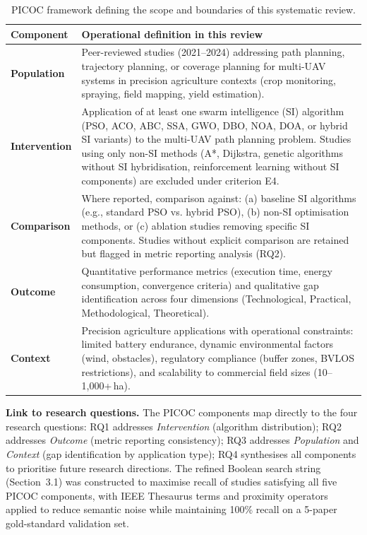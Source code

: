 \documentclass[review,3p,times]{elsarticle}
\begin{document}
\begin{table}[htbp]
\centering
\caption{PICOC framework defining the scope and boundaries of this systematic review.}
\label{tab:picoc}
\begin{tabularx}{\textwidth}{lX}
\toprule
\textbf{Component} & \textbf{Operational definition in this review} \\
\midrule
\textbf{Population} & Peer-reviewed studies (2021--2024) addressing path planning, trajectory planning, or coverage planning for multi-UAV systems in precision agriculture contexts (crop monitoring, spraying, field mapping, yield estimation). \\
\textbf{Intervention} & Application of at least one swarm intelligence (SI) algorithm (PSO, ACO, ABC, SSA, GWO, DBO, NOA, DOA, or hybrid SI variants) to the multi-UAV path planning problem. Studies using only non-SI methods (A*, Dijkstra, genetic algorithms without SI hybridisation, reinforcement learning without SI components) are excluded under criterion E4. \\
\textbf{Comparison} & Where reported, comparison against: (a) baseline SI algorithms (e.g., standard PSO vs. hybrid PSO), (b) non-SI optimisation methods, or (c) ablation studies removing specific SI components. Studies without explicit comparison are retained but flagged in metric reporting analysis (RQ2). \\
\textbf{Outcome} & Quantitative performance metrics (execution time, energy consumption, convergence criteria) and qualitative gap identification across four dimensions (Technological, Practical, Methodological, Theoretical). \\
\textbf{Context} & Precision agriculture applications with operational constraints: limited battery endurance, dynamic environmental factors (wind, obstacles), regulatory compliance (buffer zones, BVLOS restrictions), and scalability to commercial field sizes (10--1,000+\,ha). \\
\bottomrule
\end{tabularx}
\end{table}

\n\noindent\textbf{Link to research questions.} The PICOC components map directly to the four research questions: RQ1 addresses \textit{Intervention} (algorithm distribution); RQ2 addresses \textit{Outcome} (metric reporting consistency); RQ3 addresses \textit{Population} and \textit{Context} (gap identification by application type); RQ4 synthesises all components to prioritise future research directions. The refined Boolean search string (Section~3.1) was constructed to maximise recall of studies satisfying all five PICOC components, with IEEE Thesaurus terms and proximity operators applied to reduce semantic noise while maintaining 100\% recall on a 5-paper gold-standard validation set.
\end{document}
